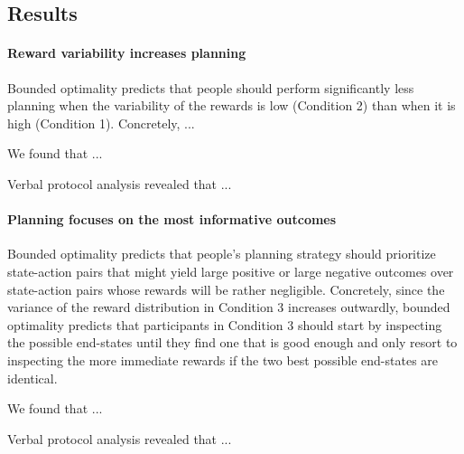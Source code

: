 
\subsection{Results}

\paragraph{Reward variability increases planning}
Bounded optimality predicts that people should perform significantly less planning when the variability of the rewards is low (Condition 2) than when it is high (Condition 1). Concretely, ...

We found that ...

Verbal protocol analysis revealed that ...

\paragraph{Planning focuses on the most informative outcomes}
Bounded optimality predicts that people's planning strategy should prioritize state-action pairs that might yield large positive or large negative outcomes over state-action pairs whose rewards will be rather negligible. Concretely, since the variance of the reward distribution in Condition 3 increases outwardly, bounded optimality predicts that participants in Condition 3 should start by inspecting the possible end-states until they find one that is good enough and only resort to inspecting the more immediate rewards if the two best possible end-states are identical.

We found that ...

Verbal protocol analysis revealed that ...

